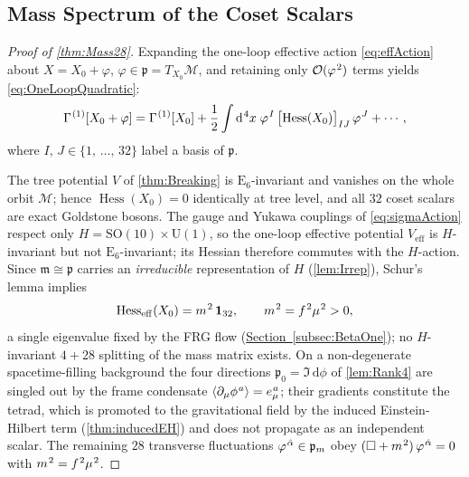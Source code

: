 \documentclass[pdflatex,sn-mathphys-num]{sn-jnl}
\theoremstyle{thmstyleone}
\theoremstyle{thmstyletwo}%
\theoremstyle{thmstylethree}%
\newcommand{\SO}[1]{\mathrm{SO(#1)}}
\newcommand{\U}[1]{\mathrm{U(#1)}}
\newcommand{\E}[1]{\mathrm{E_{#1}}}
\newcommand{\M}{\mathcal{M}}
\newcommand{\SOTen}{\SO{10}}
\newcommand{\UOne}{\U{1}}
\newcommand{\ESix}{\E{6}}
\newcommand{\SOTenXUOne}{\SOTen \times \UOne}
\newcommand{\sm}{\hspace{.065em}}
\newcommand{\subsecref}[1]{\hyperref[#1]{Section~\ref*{#1}}}
\newcommand{\smexp}[1]{^{\sm #1}}
\newcommand{\Hess}[1]{\operatorname{Hess}}
\newcommand{\dv}[1]{\mathrm{d}\smexp{#1}}
\begin{document}
\begin{appendices}
\subsection{Mass Spectrum of the Coset Scalars}
\label{app:Gravity:Mass28}

\begin{proof}[Proof of \autoref{thm:Mass28}]
Expanding the one-loop effective action \eqref{eq:effAction} about
\(X=X_{0}+\varphi\), \(\varphi\in\mathfrak p=T_{X_{0}}\mathcal M\), and retaining
only \(\mathcal O(\varphi\smexp{2})\) terms yields \eqref{eq:OneLoopQuadratic}:
\[
  \Gamma\smexp{(1)}[X_{0}+\varphi]
  = \Gamma\smexp{(1)}[X_{0}]
    + \frac12\int \dv{4}x\;\varphi\smexp{I}\,
      \bigl[\Hess V(X_{0})\bigr]_{IJ}\,
      \varphi\smexp{J}
    + \cdots,
\]
where \(I,\,J\in\{1,\,\dots,\,32\}\) label a basis of \(\mathfrak p\).

The tree potential \(V\) of \autoref{thm:Breaking} is \(\ESix\)-invariant and
vanishes on the whole orbit \(\M\); hence \(\Hess V(X_{0})=0\) identically at
tree level, and all \(32\) coset scalars are exact Goldstone bosons. The gauge
and Yukawa couplings of \eqref{eq:sigmaAction} respect only
\(H=\SOTenXUOne\), so the one-loop effective potential
\(V_{\mathrm{eff}}\) is \(H\)-invariant but not \(\ESix\)-invariant; its Hessian
therefore commutes with the \(H\)-action. Since \(\mathfrak m\cong\mathfrak p\)
carries an \emph{irreducible} representation of \(H\) (\autoref{lem:Irrep}),
Schur's lemma implies
\[
  \Hess V_{\mathrm{eff}}(X_{0}) = m\smexp{2}\,\mathbf1_{32},
  \qquad
  m\smexp{2}=f\smexp{2}\mu\smexp{2}>0,
\]
a single eigenvalue fixed by the FRG flow (\subsecref{subsec:BetaOne}); no
\(H\)-invariant \(4+28\) splitting of the mass matrix exists. On a non-degenerate
spacetime-filling background the four directions
\(\mathfrak p_{0}=\Im\,\mathrm d\phi\) of \autoref{lem:Rank4} are singled out by
the frame condensate \(\langle\partial_\mu\phi\smexp{a}\rangle=e_\mu\smexp{a}\);
their gradients constitute the tetrad, which is promoted to the gravitational
field by the induced Einstein-Hilbert term (\autoref{thm:inducedEH}) and does
not propagate as an independent scalar. The remaining \(28\) transverse
fluctuations \(\varphi\smexp{\hat\alpha}\in\mathfrak p_{m}\) obey
\((\Box+m\smexp{2})\,\varphi\smexp{\hat\alpha}=0\) with
\(m\smexp{2}=f\smexp{2}\mu\smexp{2}\).
\end{proof}



\end{appendices}
\end{document}
